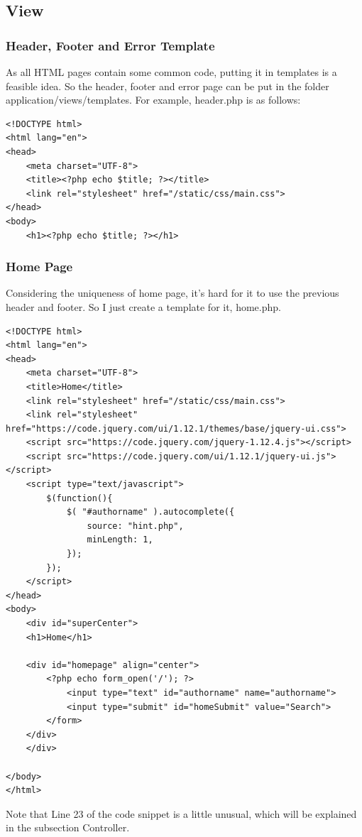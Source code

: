 \documentclass[a4paper]{article}
\begin{document}
        \subsection{View}
            \subsubsection{Header, Footer and Error Template}
As all HTML pages contain some common code, putting it in templates is a feasible idea. So the header, footer and error page can be put in the folder application/views/templates. For example, header.php is as follows:
                \begin{verbatim}
<!DOCTYPE html>
<html lang="en">
<head>
    <meta charset="UTF-8">
    <title><?php echo $title; ?></title>
    <link rel="stylesheet" href="/static/css/main.css">
</head>
<body>
    <h1><?php echo $title; ?></h1>
                \end{verbatim}
            \subsubsection{Home Page}
Considering the uniqueness of home page, it's hard for it to use the previous header and footer. So I just create a template for it, home.php.
                \begin{verbatim}
<!DOCTYPE html>
<html lang="en">
<head>
    <meta charset="UTF-8">
    <title>Home</title>
    <link rel="stylesheet" href="/static/css/main.css">
    <link rel="stylesheet" href="https://code.jquery.com/ui/1.12.1/themes/base/jquery-ui.css">
    <script src="https://code.jquery.com/jquery-1.12.4.js"></script>
    <script src="https://code.jquery.com/ui/1.12.1/jquery-ui.js"></script>
    <script type="text/javascript">
        $(function(){
            $( "#authorname" ).autocomplete({
                source: "hint.php",
                minLength: 1,
            });
        });
    </script>
</head>
<body>
    <div id="superCenter">
    <h1>Home</h1>

    <div id="homepage" align="center">
        <?php echo form_open('/'); ?>
            <input type="text" id="authorname" name="authorname">
            <input type="submit" id="homeSubmit" value="Search">
        </form>
    </div>
    </div>

</body>
</html>
                \end{verbatim}
Note that Line 23 of the code snippet is a little unusual, which will be explained in the subsection Controller.
\end{document}
